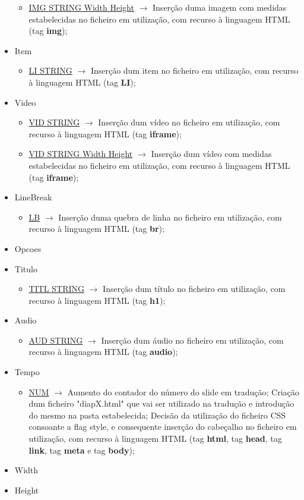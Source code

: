 \documentclass[11pt,a4paper]{report}
\begin{document}
\begin{itemize}
\begin{itemize}
		\item \underline{IMG STRING Width Height}  $\rightarrow$ Inserção duma imagem com medidas estabelecidas no ficheiro em utilização, com recurso à linguagem HTML (tag \textbf{img});
	\end{itemize}
	\item Item
	\begin{itemize}
		\item \underline{LI STRING}  $\rightarrow$ Inserção dum item no ficheiro em utilização, com recurso à linguagem HTML (tag \textbf{LI});
	\end{itemize}
	\item Video
	\begin{itemize}
		\item \underline{VID STRING}  $\rightarrow$ Inserção dum vídeo no ficheiro em utilização, com recurso à linguagem HTML (tag \textbf{iframe});
		\item \underline{VID STRING Width Height}  $\rightarrow$ Inserção dum vídeo com medidas estabelecidas no ficheiro em utilização, com recurso à linguagem HTML (tag \textbf{iframe});
	\end{itemize}
	\item LineBreak
	\begin{itemize}
		\item \underline{LB}  $\rightarrow$ Inserção duma quebra de linha no ficheiro em utilização, com recurso à linguagem HTML (tag \textbf{br});
	\end{itemize}
	\item Opcoes
	\item Titulo
	\begin{itemize}
		\item \underline{TITL STRING}  $\rightarrow$ Inserção dum título no ficheiro em utilização, com recurso à linguagem HTML (tag \textbf{h1});
	\end{itemize}
	\item Audio
	\begin{itemize}
		\item \underline{AUD STRING}  $\rightarrow$ Inserção dum áudio no ficheiro em utilização, com recurso à linguagem HTML (tag \textbf{audio});
	\end{itemize}
	\item Tempo
	\begin{itemize}
		\item \underline{NUM}  $\rightarrow$ Aumento do contador do número do slide em tradução; Criação dum ficheiro "diapX.html" que vai ser utilizado na tradução e introdução do mesmo na pasta estabelecida; Decisão da utilização do ficheiro CSS consoante a flag style, e consequente inserção do cabeçalho no ficheiro em utilização, com recurso à linguagem HTML (tag \textbf{html}, tag \textbf{head}, tag \textbf{link}, tag \textbf{meta} e tag \textbf{body});
	\end{itemize}
	\item Width
	\item Height
\end{itemize}
\end{document}
